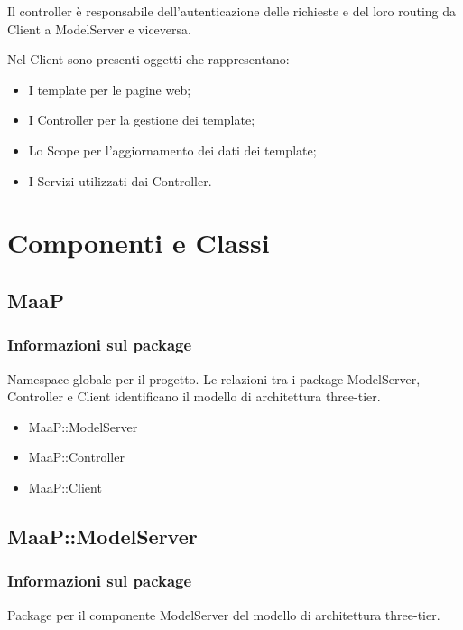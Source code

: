 Il controller è responsabile dell'autenticazione delle richieste e del loro routing da Client a ModelServer e viceversa.

Nel Client sono presenti oggetti che rappresentano:
\begin{itemize}
\item I template per le pagine web;
\item I Controller per la gestione dei template;
\item Lo Scope per l'aggiornamento dei dati dei template;
\item I Servizi utilizzati dai Controller.
\end{itemize}

\newpage
\section{Componenti e Classi}

\subsection{MaaP}
\subsubsection{Informazioni sul package}
Namespace globale per il progetto. Le relazioni tra i package ModelServer, Controller e Client identificano il modello di architettura three-tier.
\begin{itemize}
\item MaaP::ModelServer
\item MaaP::Controller
\item MaaP::Client
\end{itemize}

\subsection{MaaP::ModelServer}
\subsubsection{Informazioni sul package}
Package per il componente ModelServer del modello di architettura three-tier.

